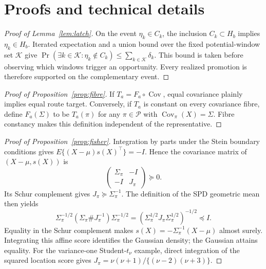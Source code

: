 \documentclass[11pt]{article}
\theoremstyle{plain}
\theoremstyle{definition}
\theoremstyle{remark}
\begin{document}


\appendix
\section{Proofs and technical details}\label{app:proofs}

\begin{proof}[Proof of Lemma~\ref{lem:latch}]
On the event $\eta_k\in C_k$, the inclusion $C_k\subset H_b$ implies
$\eta_k\in H_b$. Iterated expectation and a union bound over the fixed
potential-window set $\mathcal K$ give
$\Pr(\exists k\in\mathcal K:\eta_k\notin C_k)
\le\sum_{k\in\mathcal K}\delta_k$. This bound is taken before observing which
windows trigger an opportunity. Every realized promotion is therefore
supported on the complementary event.
\end{proof}

\begin{proof}[Proof of Proposition~\ref{prop:fibre}]
If $T_a=F_a\circ\operatorname{Cov}$, equal covariance plainly implies equal
route target. Conversely, if $T_a$ is constant on every covariance fibre,
define $F_a(\Sigma)$ to be $T_a(\pi)$ for any $\pi\in\mathcal P$ with
$\operatorname{Cov}_\pi(X)=\Sigma$. Fibre constancy makes this definition
independent of the representative.
\end{proof}

\begin{proof}[Proof of Proposition~\ref{prop:fisher}]
Integration by parts under the Stein boundary conditions gives
$E\{(X-\mu)s(X)^\top\}=-I$. Hence the covariance matrix of
$(X-\mu,s(X))$ is
\[
 \begin{pmatrix}\Sigma_\pi&-I\\-I&J_\pi\end{pmatrix}\succeq0.
\]
Its Schur complement gives $J_\pi\succeq\Sigma_\pi^{-1}$. The definition of
the SPD geometric mean then yields
\[
 \Sigma_\pi^{-1/2}(\Sigma_\pi\#J_\pi^{-1})\Sigma_\pi^{-1/2}
 =(\Sigma_\pi^{1/2}J_\pi\Sigma_\pi^{1/2})^{-1/2}\preceq I.
\]
Equality in the Schur complement makes
$s(X)=-\Sigma_\pi^{-1}(X-\mu)$ almost surely. Integrating this affine score
identifies the Gaussian density; the Gaussian attains equality. For the
variance-one Student-$t_\nu$ example, direct integration of the squared
location score gives
$J_\pi=\nu(\nu+1)/\{(\nu-2)(\nu+3)\}$.
\end{proof}
\end{document}

